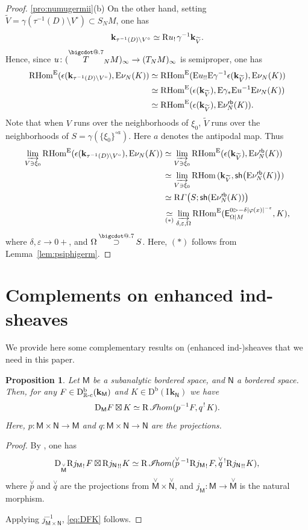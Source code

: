 \documentclass[11pt]{article}
\makeatletter
\numberwithin{equation}{section}
\let\mathcal\mathscr
\let\cl\colon
\newcommand{\accentset}[2]{\overset{#1}{#2}}
\newcommand*\bigcdot{\mathpalette\bigcdot@{.7}}
\newcommand*\bigcdot@[2]{\mathbin{\vcenter{\hbox{\scalebox{#2}{$\m@th#1\bullet$}}}}}
\newcommand{\bdot}[1]{{\accentset{\bigcdot}{#1}}\vphantom{#1}}
\newcommand{\dotsupset}{\mathbin{\bdot\supset}}
\newcommand{\bl}{\bigl(}
\newcommand{\br}{\bigr)}
\theoremstyle{plain}
\newtheorem{proposition}[theorem]{Proposition}
\theoremstyle{definition}
\newcommand{\R}{\mathbb{R}}
\newcommand{\derived}[1]{\mathrm{#1}}
\newcommand{\derd}{\derived{D}}
\newcommand{\derr}{\derived{R}}
\newcommand{\BDC}{\derd^{\mathrm{b}}}
\newcommand{\RHom}[1][]{\derr\mathrm{Hom}_{\raise1.5ex\hbox to.1em{}#1}}
\newcommand{\reim}[1]{\derr#1_{\mspace{.5mu}!}\mspace{2mu}}
\newcommand{\reeim}[1]{\derr#1_{\mspace{1mu}!!}\mspace{1mu}}
\newcommand{\FHom}{\RHom^\enh}
\newcommand{\rihom}{{\derr\mspace{2mu}\shi\!hom}}
\newcommand{\epb}[1]{#1^{\mspace{1.5mu}!}\mspace{2mu}}
\newcommand{\etens}[1][]{\mathbin{\boxtimes_{\raise1.5ex\hbox to-.1em{}#1}}}
\newcommand{\sheaffont}[1]{\mathcal{#1}}
\newcommand\shi{\sheaffont{I}}
\newcommand{\Eopb}[1]{\enh#1^{-1}}
\newcommand{\Eoim}[1]{\enh#1_*}
\newcommand{\Eeeim}[1]{\enh#1_{!!}}
\newcommand{\Enu}{\enh\nu}
\newcommand{\dual}{\mathrm{D}}
\newcommand{\Rc}{{\R\text-\mathrm{c}}}
\newcommand{\field}{\mathbf{k}}\let\cor\field
\newcommand{\ind}{\mathrm{I}\mspace{2mu}}
\newcommand{\ifield}{\ind\field}
\newcommand{\bclose}[1]{{\accentset{\vee}{#1}}}\let\cc\bclose
\newcommand{\inbordered}[1]{{#1_\infty}}
\let\inb \inbordered
\newcommand{\range}[2]{#1 \mathbin{\rhd} #2}
\newcommand{\rsect}{\derr\varGamma}
\newcommand{\rb}{\mathsf{rb}}
\newcommand{\sh}{\mathsf{sh}}
\newcommand{\bbM}{\mathsf{M}}
\newcommand{\cbM}{\bclose{\bbM}}
\newcommand{\bbN}{\mathsf{N}}
\newcommand{\cbN}{\bclose{\bbN}}
\newcommand{\ilim}[1][]{\mathop{\varinjlim}\limits_{#1}}
\newcommand{\opb}[1]{#1^{-1}}
\makeatother
\begin{document}
\begin{proof}
\eqref{pro:numugermii}(b)
On the other hand,
setting $\widetilde V = \gamma(\tau^{-1}(D)\setminus V^\circ)\subset S_NM$, one has
\[
\field_{\tau^{-1}(D)\setminus V^\circ} \simeq \reim u\opb\gamma\field_{\widetilde V}.
\]
Hence, since $u\colon\inb{(\bdot T_NM)}\to\inb{(T_NM)}$ is semiproper, one has
\begin{align*}
\FHom(\epsilon(\field_{\tau^{-1}(D)\setminus V^\circ}),\Enu_N(K))
&\simeq \FHom(\Eeeim u\Eopb\gamma \epsilon(\field_{\widetilde V}),\Enu_N(K)) \\
&\simeq \FHom(\epsilon(\field_{\widetilde V}),\Eoim\gamma\Eopb u\Enu_N(K)) \\
&\simeq \FHom(\epsilon(\field_{\widetilde V}),\Enu^\rb_N(K)).
\end{align*}
Note that when $V$ runs over the neighborhoods of $\xi_0$, $\widetilde V$ runs over the neighborhoods of $S=\gamma(\{\xi_0\}^{\circ a})$. Here $a$ denotes the antipodal map. Thus
\begin{align*}
\ilim[V\owns\xi_0] \FHom(\epsilon(\field_{\tau^{-1}(D)\setminus V^\circ}),\Enu_N(K))
&\simeq \ilim[V\owns\xi_0] \FHom(\epsilon(\field_{\widetilde V}),\Enu^\rb_N(K)) \\
&\simeq \ilim[V\owns\xi_0] \RHom(\field_{\widetilde V},\sh\bl\Enu^\rb_N(K)\br) \\
&\simeq \rsect\bl S;\sh(\Enu^\rb_N(K))\br \\
&\underset{(*)}\simeq \ilim[\delta,\varepsilon,\Omega]
\FHom( \exx^{\range0{-\delta|\varphi(x)|^{-\varepsilon}}}_{\Omega|M} , K),
\end{align*}
where $\delta,\varepsilon\to0+$, and $\Omega\dotsupset S$.
Here, $(*)$ follows from Lemma~\ref{lem:psiphigerm}.
\end{proof}

\appendix

\section{Complements on enhanced ind-sheaves}\label{se:compl}

We provide here some complementary results on (enhanced ind-)sheaves that we need in this paper.

\begin{proposition}
Let $\bbM$ be a subanalytic bordered space, and $\bbN$ a bordered space.
Then, for any $F\in\BDC_{\Rc}(\field_\bbM)$ and $K\in\BDC(\ifield_\bbN)$
we have
\begin{equation} \label{eq:DFK}
\dual_\bbM F\etens K\simeq \rihom
(\opb p F,\epb q K).
\end{equation}
Here, $p\cl \bbM\times\bbN\to\bbM$ and $q\cl\bbM\times\bbN\to\bbN$
are the projections.
\end{proposition}
\begin{proof}
By \cite[Prop.\,2.3.4]{DK16}, one has
\[
\dual_\cbM\reim{{j_\bbM}} F\etens \reeim{{j_\bbN}} K\simeq \rihom
(\cc p{}^{\,-1}\reim{{j_\bbM}} F,\cc q{}^{\,!}\reeim{{j_\bbN}} K),
\]
where $\cc p$ and $\cc q$ are the projections from $\cbM\times\cbN$, and $j_\bbM\colon\bbM\to\cbM$ is the natural morphism.

Applying $\opb j_{\bbM\times\bbN}$, \eqref{eq:DFK} follows.
\end{proof}
\end{document}
